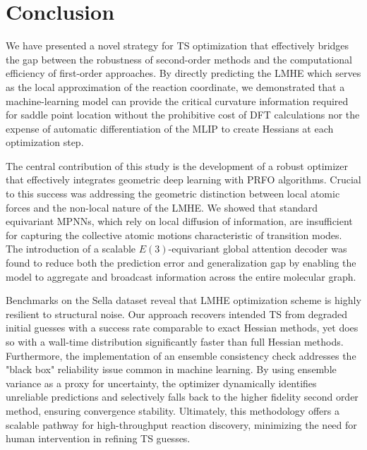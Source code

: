 \documentclass[12pt]{article}
\begin{document}

\section{Conclusion}
We have presented a novel strategy for TS optimization that effectively bridges the gap between the robustness of second-order methods and the computational efficiency of first-order approaches. By directly predicting the LMHE which serves as the local approximation of the reaction coordinate, we demonstrated that a machine-learning model can provide the critical curvature information required for saddle point location without the prohibitive cost of DFT calculations nor the expense of automatic differentiation of the MLIP to create Hessians at each optimization step.\par

The central contribution of this study is the development of a robust optimizer that effectively integrates geometric deep learning with PRFO algorithms. Crucial to this success was addressing the geometric distinction between local atomic forces and the non-local nature of the LMHE. We showed that standard equivariant MPNNs, which rely on local diffusion of information, are insufficient for capturing the collective atomic motions characteristic of transition modes. The introduction of a scalable $E(3)$-equivariant global attention decoder was found to reduce both the prediction error and generalization gap by enabling the model to aggregate and broadcast information across the entire molecular graph.\par

Benchmarks on the Sella dataset reveal that LMHE optimization scheme is highly resilient to structural noise. Our approach recovers intended TS from degraded initial guesses with a success rate comparable to exact Hessian methods, yet does so with a wall-time distribution significantly faster than full Hessian methods. Furthermore, the implementation of an ensemble consistency check addresses the "black box" reliability issue common in machine learning. By using ensemble variance as a proxy for uncertainty, the optimizer dynamically identifies unreliable predictions and selectively falls back to the higher fidelity second order method, ensuring convergence stability. Ultimately, this methodology offers a scalable pathway for high-throughput reaction discovery, minimizing the need for human intervention in refining TS guesses.\par
\end{document}
